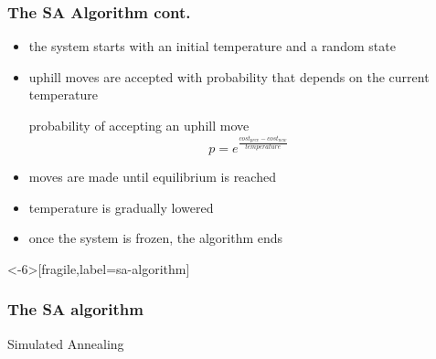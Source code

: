 \documentclass{beamer}
\begin{document}
\begin{frame}
  \frametitle{The SA Algorithm cont.}

  \begin{itemize}
  \item the system starts with an initial temperature and a random state
  \item uphill moves are accepted with probability that depends on the current
    temperature
    \begin{block}{probability of accepting an uphill move}
      \begin{equation*}
        p = e^{\frac{cost_{prev} - cost_{new}}{temperature}}
      \end{equation*}
    \end{block}
  \item moves are made until equilibrium is reached
  \item temperature is gradually lowered
  \item once the system is frozen, the algorithm ends
  \end{itemize}

\end{frame}

\begin{frame}<-6>[fragile,label=sa-algorithm]
  \frametitle{The SA algorithm}

\begin{block}{Simulated Annealing}
\begin{semiverbatim}
\end{semiverbatim}
\end{block}

\end{frame}
\end{document}
